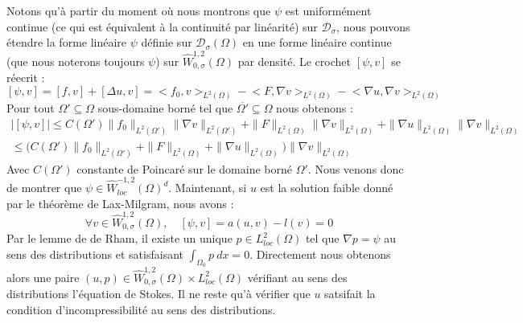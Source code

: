Notons qu'à partir du moment où nous montrons que $\psi$ est uniformément continue (ce qui est équivalent à la continuité par linéarité) sur $\mathcal{D}_{\sigma}$, nous pouvons étendre la forme linéaire $\psi$ définie sur $\mathcal{D}_{\sigma}(\Omega)$ en une forme linéaire continue (que nous noterons toujours $\psi$) sur $\widehat{W}^{1,2}_{0,\sigma}(\Omega)$ par densité.
Le crochet $[\psi,v]$ se réecrit :
$$ [\psi,v] = [f,v] + [\Delta u,v] = \big< f_0, v \big>_{L^2(\Omega)} -\big< F,\nabla v \big>_{L^2(\Omega)} - \big< \nabla u, \nabla v \big>_{L^2(\Omega)} $$
Pour tout $\Omega' \subseteq \Omega$ sous-domaine borné tel que $\overline{\Omega'} \subseteq \Omega$ nous obtenons :
\begin{align*}
    \Big|[\psi,v]\Big| \leq C(\Omega') \|f_0\|_{L^2(\Omega')}\|\nabla v\|_{L^2(\Omega')} + \|F\|_{L^2(\Omega)}\|\nabla v\|_{L^2(\Omega)} + \|\nabla u\|_{L^2(\Omega)}\|\nabla v\|_{L^2(\Omega)} \\
    \leq \big( C(\Omega') \|f_0\|_{L^2(\Omega')} + \|F\|_{L^2(\Omega)} + \|\nabla u\|_{L^2(\Omega)} \big)\|\nabla v\|_{L^2(\Omega)}
\end{align*}
Avec $C(\Omega')$ constante de Poincaré sur le domaine borné $\Omega'$.
Nous venons donc de montrer que $\psi \in \widehat{W}_{loc}^{-1,2}(\Omega)^d$. Maintenant, si $u$ est la solution faible donné par le théorème de Lax-Milgram, nous avons : 
$$\forall v \in \widehat{W}_{0,\sigma}^{1,2}(\Omega), \quad [\psi, v] = a(u,v) - l(v) = 0 $$
Par le lemme de de Rham, il existe un unique $p \in L^2_{loc}(\Omega)$ tel que $\nabla p = \psi$ au sens des distributions et satisfaisant $\displaystyle \int_{\Omega_0} p \ dx = 0$.
Directement nous obtenons alors une paire $(u,p) \in \widehat{W}_{0,\sigma}^{1,2}(\Omega)\times L^2_{loc}(\Omega)$ vérifiant au sens des distributions l'équation de Stokes. Il ne reste qu'à vérifier que $u$ satsifait la condition d'incompressibilité au sens des distributions. \\
